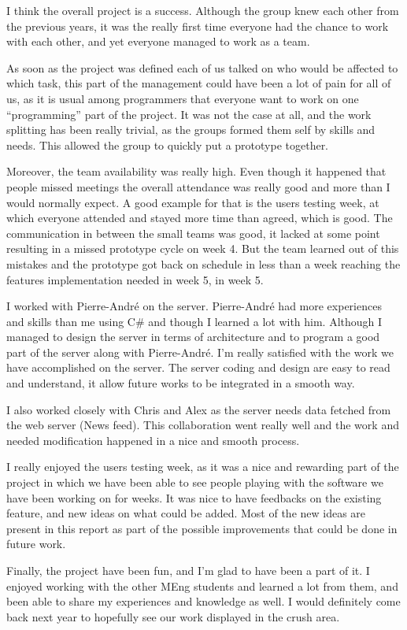 I think the overall project is a success. Although the group knew each
other from the previous years, it was the really first time everyone had
the chance to work with each other, and yet everyone managed to work as a
team. 

As soon as the project was defined each of us talked on who would be
affected to which task, this part of the management could have been a
lot of pain for all of us, as it is usual among programmers that everyone
want to work on one ``programming'' part of the project. It was not the
case at all, and the work splitting has been really trivial, as the
groups formed them self by skills and needs. This allowed the group
to quickly put a prototype together.

Moreover, the team availability was really high. Even though it happened
that people missed meetings the overall attendance was really good and
more than I would normally expect. A good example for that is the users
testing week, at which everyone attended and stayed more time than
agreed, which is good. The communication in between the small teams was
good, it lacked at some point resulting in a missed prototype cycle
on week 4. But the team learned out of this mistakes and the prototype
got back on schedule in less than a week reaching the features
implementation needed in week 5, in week 5.

I worked with Pierre-André on the server. Pierre-André had more experiences
and skills than me using C\# and though I learned a lot with him.
Although I managed to design the server in terms of architecture and to
program a good part of the server along with Pierre-André. I'm really
satisfied with the work we have accomplished on the server. The server
coding and design are easy to read and understand, it allow future works
to be integrated in a smooth way.

I also worked closely with Chris and Alex as the server needs data fetched
from the web server (News feed). This collaboration went really well and
the work and needed modification happened in a nice and smooth process.

I really enjoyed the users testing week, as it was a nice and rewarding 
part of the project in which we have been able to see people playing with
the software we have been working on for weeks. It was nice to have feedbacks
on the existing feature, and new ideas on what could be added. Most of the
new ideas are present in this report as part of the possible improvements that
could be done in future work.

Finally, the project have been fun, and I'm glad to have been a part of it.
I enjoyed working with the other MEng students and learned a lot from them,
and been able to share my experiences and knowledge as well. I would definitely
come back next year to hopefully see our work displayed in the crush area.
